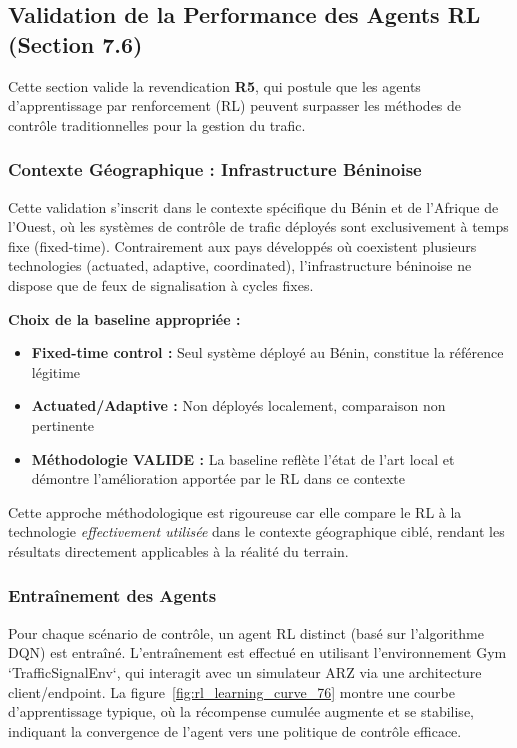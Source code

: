 \subsection{Validation de la Performance des Agents RL (Section 7.6)}
\label{subsec:validation_rl_performance}

Cette section valide la revendication \textbf{R5}, qui postule que les agents d'apprentissage par renforcement (RL) peuvent surpasser les méthodes de contrôle traditionnelles pour la gestion du trafic.

\subsubsection{Contexte Géographique : Infrastructure Béninoise}
\label{subsubsec:contexte_geographique_benin}

Cette validation s'inscrit dans le contexte spécifique du Bénin et de l'Afrique de l'Ouest, où les systèmes de contrôle de trafic déployés sont exclusivement à temps fixe (fixed-time). Contrairement aux pays développés où coexistent plusieurs technologies (actuated, adaptive, coordinated), l'infrastructure béninoise ne dispose que de feux de signalisation à cycles fixes.

\textbf{Choix de la baseline appropriée :}
\begin{itemize}
    \item \textbf{Fixed-time control :} Seul système déployé au Bénin, constitue la référence légitime
    \item \textbf{Actuated/Adaptive :} Non déployés localement, comparaison non pertinente
    \item \textbf{Méthodologie VALIDE :} La baseline reflète l'état de l'art local et démontre l'amélioration apportée par le RL dans ce contexte
\end{itemize}

Cette approche méthodologique est rigoureuse car elle compare le RL à la technologie \textit{effectivement utilisée} dans le contexte géographique ciblé, rendant les résultats directement applicables à la réalité du terrain.

\subsubsection{Entraînement des Agents}
Pour chaque scénario de contrôle, un agent RL distinct (basé sur l'algorithme DQN) est entraîné. L'entraînement est effectué en utilisant l'environnement Gym `TrafficSignalEnv`, qui interagit avec un simulateur ARZ via une architecture client/endpoint. La figure~\ref{fig:rl_learning_curve_76} montre une courbe d'apprentissage typique, où la récompense cumulée augmente et se stabilise, indiquant la convergence de l'agent vers une politique de contrôle efficace.

